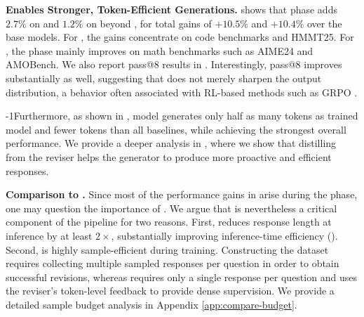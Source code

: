 \textbf{\opsd{} Enables Stronger, Token-Efficient Generations.}
 shows that \opsd{} phase adds $2.7\%$ on \qwen{} and $1.2\%$ on \olmo{} beyond \sft{}, for total gains of $+10.5\%$ and $+10.4\%$ over the base models. For \qwen{}, the gains concentrate on code benchmarks and HMMT25. For \olmo{}, the \opsd{} phase mainly improves on math benchmarks such as AIME24 and AMOBench. We also report pass@8 results in . Interestingly, pass@8 improves substantially as well, suggesting that \ours{} does not merely sharpen the output distribution, a behavior often associated with RL-based methods such as GRPO \citep{yue2025does}.




\looseness-1Furthermore, as shown in ,  \ours{} model generates only half as many tokens as \sft{} trained model and fewer tokens than all baselines, while achieving the strongest overall performance. We provide a deeper analysis  in , where we show that distilling from the reviser helps the generator to produce more proactive and efficient responses.


\textbf{Comparison to \sft{}.} Since most of the performance gains in \ours{} arise during the \sft{} phase, one may question the importance of \opsd{}. We argue that \opsd{} is nevertheless a critical component of the \ours{} pipeline for two reasons. First, \opsd{} reduces response length at inference by at least $2\times$, substantially improving inference-time efficiency (). Second, \opsd{} is highly sample-efficient during training. Constructing the \sft{} dataset requires collecting multiple sampled responses per question in order to obtain successful revisions, whereas \opsd{} requires only a single response per question and uses the reviser’s token-level feedback to provide dense supervision. We provide a detailed sample budget analysis in Appendix \ref{app:compare-budget}.

